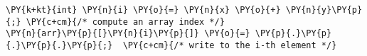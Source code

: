 \begin{Verbatim}[commandchars=\\\{\},codes={\catcode`\$=3\catcode`\^=7\catcode`\_=8}]
\PY{k+kt}{int} \PY{n}{i} \PY{o}{=} \PY{n}{x} \PY{o}{+} \PY{n}{y}\PY{p}{;} \PY{c+cm}{/* compute an array index */}
\PY{n}{arr}\PY{p}{[}\PY{n}{i}\PY{p}{]} \PY{o}{=} \PY{p}{.}\PY{p}{.}\PY{p}{.}\PY{p}{;}  \PY{c+cm}{/* write to the i-th element */}
\end{Verbatim}
